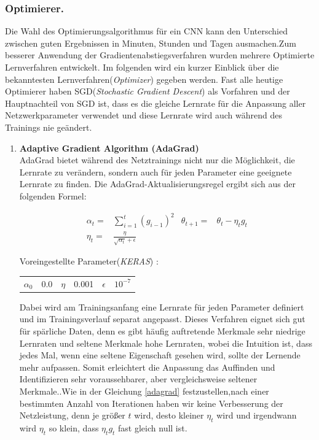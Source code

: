 \documentclass[12pt,a4paper]{scrartcl}
\numberwithin{equation}{section}
\begin{document}
\subsubsection{Optimierer.}\label{Optimizer}
Die Wahl des Optimierungsalgorithmus für ein \ac{CNN} kann den Unterschied zwischen guten Ergebnissen in Minuten, Stunden und Tagen ausmachen.Zum besserer Anwendung der Gradientenabstiegsverfahren wurden mehrere Optimierte Lernverfahren entwickelt. Im folgenden wird ein kurzer Einblick über die bekanntesten Lernverfahren(\textit{Optimizer})  gegeben werden. Fast alle heutige Optimierer haben SGD(\textit{Stochastic Gradient Descent}) als Vorfahren und der Hauptnachteil von SGD ist, dass es die gleiche Lernrate für die Anpassung aller Netzwerkparameter verwendet und diese Lernrate wird auch während des Trainings nie geändert. 
\begin{enumerate}
	
\item \textbf{Adaptive Gradient Algorithm (AdaGrad)}\\
AdaGrad bietet während des Netztrainings nicht nur die Möglichkeit, die Lernrate zu verändern, sondern auch für jeden Parameter eine geeignete Lernrate zu finden. Die AdaGrad-Aktualisierungsregel ergibt sich aus der folgenden Formel:

\begin{equation}\label{adagrad}
\begin{aligned}
\alpha_{t}=&\sum_{i = 1}^{t}{(g_{i-1})^2} &
\theta_{t+1} =& \theta_{t} -\eta_{t} g_t \\ \eta_{t} =& \frac{\eta}{\sqrt{\alpha_{t}}+\epsilon}
\end{aligned}
\end{equation}
\begin{center}
	Voreingestellte Parameter(\textit{KERAS}) :
	\begin{tabular}{r@{= }l c@{= }c r@{= }l}
		$ \alpha_{0} $& 0.0 & $ \eta$& 0.001& $ \epsilon $ & $ 10^{-7} $
	\end{tabular}
\end{center}
Dabei wird am Trainingsanfang eine Lernrate für jeden Parameter definiert und im Trainingsverlauf separat angepasst. 
Dieses Verfahren eignet sich gut für spärliche Daten, denn es gibt häufig auftretende Merkmale sehr niedrige Lernraten und seltene Merkmale hohe Lernraten, wobei die Intuition ist, dass jedes Mal, wenn eine seltene Eigenschaft gesehen wird, sollte der Lernende mehr aufpassen. Somit erleichtert die Anpassung das Auffinden und Identifizieren sehr voraussehbarer, aber vergleichsweise seltener Merkmale.\cite{AdaGrad}.Wie in der Gleichung \eqref{adagrad} festzustellen,nach einer bestimmten Anzahl von Iterationen haben wir keine Verbesserung der Netzleistung, denn je größer $ t $ wird, desto kleiner $ \eta_{t} $ wird und irgendwann wird $ \eta_{t} $ so klein, dass $ \eta_{t}g_{t} $ fast gleich null ist.


\end{enumerate}
\end{document}

